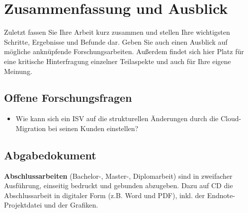 \section{Zusammenfassung und Ausblick}
\label{cha:fazit}
Zuletzt fassen Sie Ihre Arbeit kurz zusammen und stellen Ihre wichtigsten Schritte, Ergebnisse und Befunde dar. Geben Sie auch einen Ausblick auf mögliche anknüpfende Forschungsarbeiten. Außerdem findet sich hier Platz für eine kritische Hinterfragung einzelner Teilaspekte und auch für Ihre eigene Meinung.

\subsection{Offene Forschungsfragen}
\begin{itemize}
	\item Wie kann sich ein ISV auf die strukturellen Änderungen durch die 
Cloud-Migration bei seinen Kunden einstellen?
\end{itemize}


\subsection{Abgabedokument}
\textbf{Abschlussarbeiten} (Bachelor-, Master-, Diplomarbeit) sind in zweifacher 
Ausführung, einseitig bedruckt und gebunden abzugeben. Dazu auf CD die 
Abschlussarbeit in digitaler Form (z.B. Word und PDF), inkl. der 
Endnote-Projektdatei und der Grafiken. 
